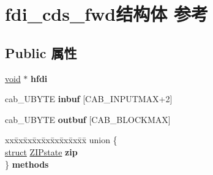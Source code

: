 \hypertarget{structfdi__cds__fwd}{}\section{fdi\+\_\+cds\+\_\+fwd结构体 参考}
\label{structfdi__cds__fwd}
\subsection*{Public 属性}
\begin{DoxyCompactItemize}
\item 
\mbox{\label{structfdi__cds__fwd_ada73c4d21a3b207486d09de5485aab26}} 
\hyperlink{interfacevoid}{void} $\ast$ {\bfseries hfdi}
\item 
\mbox{\label{structfdi__cds__fwd_af8c0f4706826baae60d8544072e8721c}} 
cab\+\_\+\+U\+B\+Y\+TE {\bfseries inbuf} \mbox{[}C\+A\+B\+\_\+\+I\+N\+P\+U\+T\+M\+AX+2\mbox{]}
\item 
\mbox{\label{structfdi__cds__fwd_a1f80d0ef4c3e3ea53330309a291460fd}} 
cab\+\_\+\+U\+B\+Y\+TE {\bfseries outbuf} \mbox{[}C\+A\+B\+\_\+\+B\+L\+O\+C\+K\+M\+AX\mbox{]}
\item 
\mbox{\label{structfdi__cds__fwd_a6671d2d309089df41a81584803e01a23}} 
\begin{tabbing}
xx\=xx\=xx\=xx\=xx\=xx\=xx\=xx\=xx\=\kill
union \{\\
\>\hyperlink{interfacestruct}{struct} \hyperlink{struct_z_i_pstate}{ZIPstate} {\bfseries zip}\\
\} {\bfseries methods}\\


\end{tabbing}
\end{DoxyCompactItemize}

